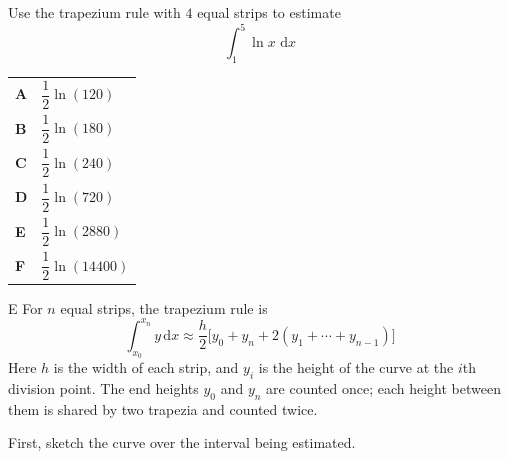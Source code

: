 \documentclass[11pt,a4paper]{article}
\begin{document}
\begin{enumerate}[label=\textbf{\arabic*.},leftmargin=*,itemsep=0pt,start=4]
\questionitem[Integration]
Use the trapezium rule with $4$ equal strips to estimate \[ \int_{1}^{5} \ln x\,\,\mathrm{d}x \]

\par\vspace*{12pt}
\begin{tabularx}{\linewidth}{@{}>{\bfseries}l Y@{}}
A &
$\dfrac{1}{2}\ln(120)$
\\[0.8em]
B &
$\dfrac{1}{2}\ln(180)$
\\[0.8em]
C &
$\dfrac{1}{2}\ln(240)$
\\[0.8em]
D &
$\dfrac{1}{2}\ln(720)$
\\[0.8em]
E &
$\dfrac{1}{2}\ln(2880)$
\\[0.8em]
F &
$\dfrac{1}{2}\ln(14400)$
\\
\end{tabularx}

\begin{djsSolution}{E}
For $n$ equal strips, the trapezium rule is
\[
\int_{x_0}^{x_n}y\,\mathrm{d}x\approx\frac{h}{2}\bigl[y_0+y_n+2(y_1+\cdots+y_{n-1})\bigr]
\]
Here $h$ is the width of each strip, and $y_i$ is the height of the curve at the $i$th division point. The end heights $y_0$ and $y_n$ are counted once; each height between them is shared by two trapezia and counted twice.

First, sketch the curve over the interval being estimated.

\begin{djsSolutionFigure}
\end{djsSolutionFigure}


\end{djsSolution}
\end{enumerate}
\end{document}
